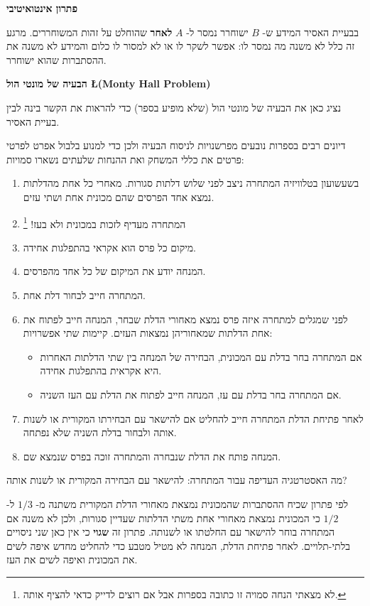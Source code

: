 
\textbf{\Large פתרון אינטואיטיבי}

בבעיית האסיר המידע ש-%
$B$
ישוחרר נמסר ל-%
$A$
\textbf{לאחר}
שהוחלט על זהות המשוחררים. מרגע זה כלל לא משנה מה נמסר לו: אפשר
לשקר לו או לא למסור לו כלום והמידע לא משנה את ההסתברות שהוא ישוחרר.


\medskip\textbf{\Large הבעיה של מונטי הול \normalsize \L{(Monty Hall Problem)}}

נציג כאן את הבעיה של מונטי הול (שלא מופיע בספר) כדי להראות את הקשר  בינה לבין בעיית האסיר.

דיונים רבים בספרות נובעים מפרשנויות לניסוח הבעיה ולכן כדי למנוע בלבול אפרט לפרטי פרטים את כללי המשחק ואת ההנחות שלעתים נשארו סמויות:

\begin{enumerate}
\item
בשעשועון בטלוויזיה המתחרה ניצב לפני שלוש דלתות סגורות. מאחרי כל אחת מהדלתות נמצא אחד הפרסים שהם מכונית אחת ושתי עזים.
\item
המתחרה מעדיף לזכות במכונית ולא בעז!%
\footnote{%
לא מצאתי הנחה סמויה זו כתובה בספרות אבל אם רוצים לדייק כדאי להציף אותה.}
\item
מיקום כל פרס הוא אקראי בהתפלגות אחידה.
\item
המנחה יודע את המיקום של כל אחד מהפרסים. 
\item
המתחרה חייב לבחור דלת אחת.
\item
לפני שמגלים למתחרה איזה פרס נמצא מאחורי הדלת שבחר, המנחה חייב לפתוח את אחת הדלתות שמאחוריהן נמצאות העזים. קיימות שתי אפשרויות:
\begin{itemize}
\item
אם המתחרה בחר בדלת עם המכונית, הבחירה של המנחה בין שתי הדלתות האחרות היא אקראית בהתפלגות אחידה.
\item
אם המתחרה בחר בדלת עם עז, המנחה חייב לפתוח את הדלת עם העז השניה.
\end{itemize}
\item
לאחר פתיחת הדלת המתחרה חייב להחליט אם להישאר עם הבחירתו המקורית או לשנות אותה ולבחור בדלת השניה שלא נפתחה.
\item
המנחה פותח את הדלת שנבחרה והמתחרה זוכה בפרס שנמצא שם.
\end{enumerate}
מה האסטרטגיה העדיפה עבור המתחרה: להישאר עם הבחירה המקורית או לשנות אותה?

לפי פתרון שכיח ההסתברות שהמכונית נמצאת מאחורי הדלת המקורית משתנה מ-%
$1/3$
ל-%
$1/2$
כי המכונית נמצאת מאחורי אחת משתי הדלתות שעדיין סגורות, ולכן לא משנה אם המתחרה בוחר להישאר עם החלטתו או לשנותה. פתרון זה 
\textbf{שגוי}
כי אין כאן שני ניסויים בלתי-תלויים. לאחר פתיחת הדלת, המנחה לא
מטיל מטבע כדי להחליט מחדש איפה לשים את המכונית ואיפה לשים את העז.

